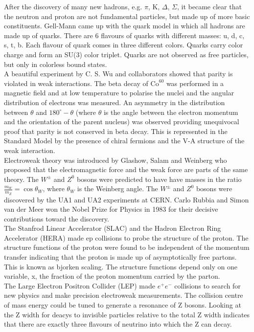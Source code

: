 After the discovery of many new hadrons, e.g. $\pi$, K, $\Delta$, $\Sigma$, it
became clear that the neutron and proton are not fundamental particles, but made
up of more basic constituents. Gell-Mann came up with the quark model in which 
all hadrons are made up of quarks. There are 6 flavours of quarks with different
masses: u, d, c, s, t, b. Each flavour of quark comes in three different colors.
Quarks carry color charge and form an SU(3) color triplet. Quarks are not 
observed as free particles, but only in colorless bound states. \\

A beautiful experiment by C. S. Wu and collaborators showed that parity is
violated in weak interactions. The beta decay of $\mbox{Co}^{60}$ was performed 
in a magnetic field and at low temperature to polarise the nuclei and the 
angular distribution of electrons was measured. An asymmetry in the distribution
between $\theta$ and $180^{\circ} - \theta$ (where $\theta$ is the angle between 
the electron momentum and the orientation of the parent nucleus) was observed
providing unequivocal proof that parity is not conserved in beta decay. This is
represented in the Standard Model by the presence of chiral fermions and the V-A 
structure of the weak interaction. \\

Electroweak theory was introduced by Glashow, Salam and Weinberg who proposed
that the electromagnetic force and the weak force are parts of the same theory. 
The $W^{\pm}$ and $Z^{0}$ bosons were predicted to have have masses in the ratio
$\frac{m_{W}}{m_{Z}} = \cos{\theta_{W}}$, where $\theta_{W}$ is the
Weinberg angle. The $W^{\pm}$ and $Z^{0}$ bosons were discovered by the UA1 and 
UA2 experiments at CERN. Carlo Rubbia and Simon van der Meer won the Nobel Prize
for Physics in 1983 for their decisive contributions toward the discovery. \\

The Stanfrod Linear Accelerator (SLAC) and the Hadron Electron Ring Accelerator
(HERA) made ep collisions to probe the structure of the proton. The structure 
functions of the proton were found to be independent of the momentum transfer 
indicating that the proton is made up of asymptotically free partons. This is
known as bjorken scaling. The structure functions depend only on one variable, 
x, the fraction of the proton momentum carried by the parton. \\

The Large Electron Positron Collider (LEP) made $e^{+}e^{-}$ collisions to
search for new physics and make precision electroweak measurements. The
collision centre of mass energy could be tuned to generate a resonance of Z
bosons. Looking at the Z width for deacys to invisible particles relative to the
total Z width indicates that there are exactly three flavours of neutrino into
which the Z can decay. 

